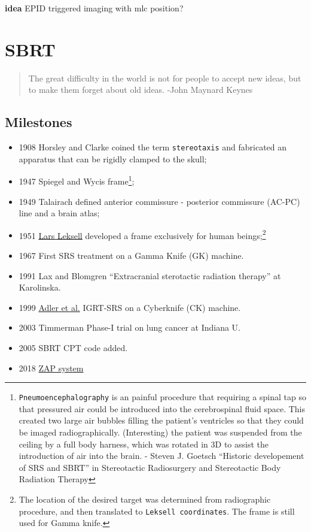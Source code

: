 \documentclass[]{book}
\providecommand{\tightlist}{%
  \setlength{\itemsep}{0pt}\setlength{\parskip}{0pt}}
\let\rmarkdownfootnote\footnote%
\def\footnote{\protect\rmarkdownfootnote}
\theoremstyle{definition}
\theoremstyle{definition}
\theoremstyle{definition}
\theoremstyle{remark}
\begin{document}
\textbf{idea} EPID triggered imaging with mlc position?

\chapter{SBRT}\label{sbrt}

\begin{quote}
The great difficulty in the world is not for people to accept new ideas,
but to make them forget about old ideas. -John Maynard Keynes
\end{quote}

\section{Milestones}\label{milestones}

\begin{itemize}
\tightlist
\item
  1908 Horsley and Clarke coined the term \texttt{stereotaxis} and
  fabricated an apparatus that can be rigidly clamped to the skull;
\item
  1947 Spiegel and Wycis frame\footnote{\texttt{Pneumoencephalography}
    is an painful procedure that requiring a spinal tap so that
    pressured air could be introduced into the cerebrospinal fluid
    space. This created two large air bubbles filling the patient's
    ventricles so that they could be imaged radiographically.
    (Interesting) the patient was suspended from the ceiling by a full
    body harness, which was rotated in 3D to assist the introduction of
    air into the brain. - Steven J. Goetsch ``Historic developement of
    SRS and SBRT'' in Stereotactic Radiosurgery and Stereotactic Body
    Radiation Therapy};
\item
  1949 Talairach defined anterior commissure - posterior commissure
  (AC-PC) line and a brain atlas;
\item
  1951 \href{https://en.wikipedia.org/wiki/Lars_Leksell}{Lars Leksell}
  developed a frame exclusively for human beings;\footnote{The location
    of the desired target was determined from radiographic procedure,
    and then translated to \texttt{Leksell\ coordinates}. The frame is
    still used for Gamma knife.}
\item
  1967 First SRS treatment on a Gamma Knife (GK) machine.
\item
  1991 Lax and Blomgren ``Extracranial sterotactic radiation therapy''
  at Karolinska.
\item
  1999 \href{https://www.ncbi.nlm.nih.gov/pubmed/10371630}{Adler et al.}
  IGRT-SRS on a Cyberknife (CK) machine.
\item
  2003 Timmerman Phase-I trial on lung cancer at Indiana U.
\item
  2005 SBRT CPT code added.
\item
  2018
  \href{https://www.cureus.com/articles/9924-self-shielding-analysis-of-the-zap-x-system}{ZAP
  system}
\end{itemize}
\end{document}
